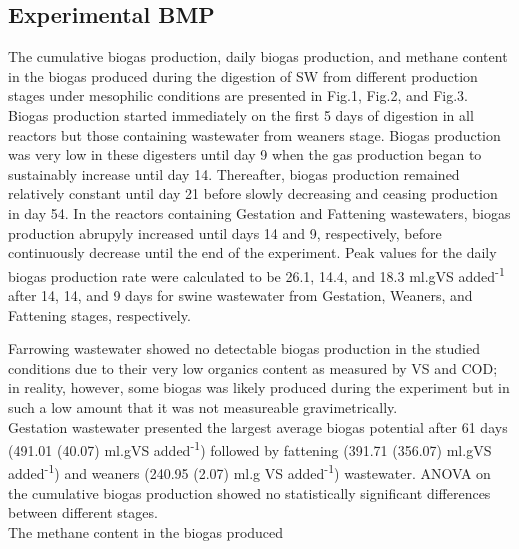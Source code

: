 \subsection{Experimental BMP}
The cumulative biogas production, daily biogas production, and methane content in the biogas produced during the digestion of SW from different production stages under mesophilic conditions are presented in Fig.1, Fig.2, and Fig.3.\\

Biogas production started immediately on the first 5 days of digestion in all reactors but those containing wastewater from weaners stage. Biogas production was very low in these digesters until day 9 when the gas production began to sustainably increase until day 14. Thereafter, biogas production remained relatively constant until day 21 before slowly decreasing and ceasing production in day 54. In the reactors containing Gestation and Fattening wastewaters, biogas production abrupyly increased until days 14 and 9, respectively, before continuously decrease until the end of the experiment. Peak values for the daily biogas production rate were calculated to be 26.1, 14.4, and 18.3 ml.gVS added\textsuperscript{-1} after 14, 14, and 9 days for swine wastewater from Gestation, Weaners, and Fattening stages, respectively.

Farrowing wastewater showed no detectable biogas production in the studied conditions due to their very low organics content as measured by VS and COD; in reality, however, some biogas was likely produced during the experiment but in such a low amount that it was not measureable gravimetrically.\\
Gestation wastewater presented the largest average biogas potential after 61 days (491.01 (40.07) ml.gVS added\textsuperscript{-1}) followed by fattening (391.71 (356.07) ml.gVS added\textsuperscript{-1}) and weaners (240.95 (2.07) ml.g VS added\textsuperscript{-1}) wastewater. ANOVA on the cumulative biogas production showed no statistically significant differences between different stages.\\
The methane content in the biogas produced